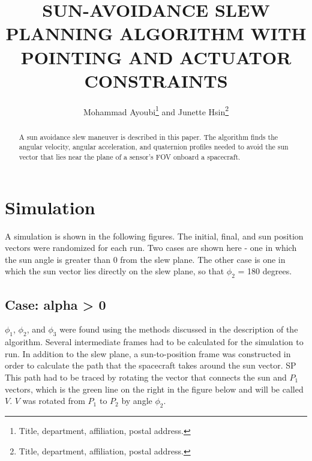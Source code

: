 \documentclass[letterpaper, preprint, paper,11pt]{AAS}	%
\begin{document}
	
	\title{SUN-AVOIDANCE SLEW PLANNING ALGORITHM WITH POINTING AND ACTUATOR CONSTRAINTS}
	
	\author{
		Mohammad Ayoubi\thanks{Title, department, affiliation, postal address.} and Junette Hsin\thanks{Title, department, affiliation, postal address.}
	}
	
	
	\maketitle{} 		
	
	
	\begin{abstract}
		
		A sun avoidance slew maneuver is described in this paper. The algorithm finds the angular velocity, angular acceleration, and quaternion profiles needed to avoid the sun vector that lies near the plane of a sensor's FOV onboard a spacecraft. 
		
		
	\end{abstract}
	
	\section{Simulation}
				
		A simulation is shown in the following figures. The initial, final, and sun position vectors were randomized for each run. Two cases are shown here - one in which the sun angle is greater than 0 from the slew plane. The other case is one in which the sun vector lies directly on the slew plane, so that $\phi_2$ = 180 degrees. 
		
		\subsection{Case: alpha > 0} 
		
		$\phi_1$, $\phi_2$, and $\phi_3$ were found using the methods discussed in the description of the algorithm. Several intermediate frames had to be calculated for the simulation to run. In addition to the slew plane, a sun-to-position frame was constructed in order to calculate the path that the spacecraft takes around the sun vector. SP This path had to be traced by rotating the vector that connects the sun and $P_1$ vectors, which is the green line on the right in the figure below and will be called $V$. $V$ was rotated from $P_1$ to $P_2$ by angle $\phi_2$. 
		
\end{document}
